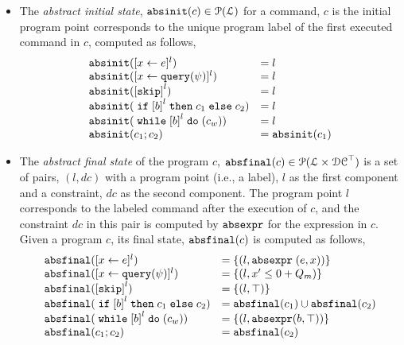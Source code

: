 \begin{itemize}
 \item The \emph{abstract initial state}, $\mathtt{abs}{\mathtt{init}}(c) \in \mathcal{P}(\mathcal{L})$
 for a command, $c$ is the initial program point corresponds to the unique program label of the first executed command in $c$,
 computed as follows,
%
\[
 \begin{array}{ll}
 \absinit(\clabel{\assign{x}{\expr}}{}^l) & = l \\
 \absinit(\clabel{\assign{x}{\query(\qexpr)}}{}^l) & = l \\
 \absinit(\clabel{\eskip}^{l}) & = l \\
 \absinit(\eif \clabel{\bexpr}^{l} \ethen c_1 \eelse c_2) & = l\\
 \absinit(\ewhile \clabel{\bexpr}^{l} \edo (c_w)) & = l \\
 \absinit(c_1 ; c_2) & = \absinit(c_1) \\
 \end{array}
 \]
\item The \emph{abstract final state} of the program $c$, 
$\mathtt{abs}{\mathtt{final}}(c) \in \mathcal{P}(\mathcal{L} \times \mathcal{DC}^{\top})$
is a set of pairs, $(l, dc)$ with a
program point (i.e., a label), $l$ as the first component and a constraint, 
$dc$ as the second component.
The program point $l$ corresponds to the labeled command after the execution of $c$,
and the constraint $dc$ in this pair is computed by $\mathtt{abs}{\mathtt{expr}}$ for the expression in $c$.
\\
Given a program $c$, its final state, $\mathtt{abs}{\mathtt{final}}(c)$ is computed as follows,
 \[
 \begin{array}{ll}
 \absfinal(\clabel{\assign{x}{\expr}}{}^l) & = \{(l, \absexpr\eapp (\expr, x))\} \\
 \absfinal(\clabel{\assign{x}{\query(\qexpr)}}{}^l) & = \{
 (l, x' \leq 0 + Q_m )\} \\
 \absfinal(\clabel{\eskip}^{l}) 
 & = \{(l, \top)\} \\
 \absfinal(\eif \clabel{\bexpr}^{l} \ethen c_1 \eelse c_2) & = \absfinal(c_1) \cup \absfinal(c_2) \\
 \absfinal(\ewhile \clabel{\bexpr}^{l} \edo (c_w)) & = \{(l, \absexpr(\bexpr, \top))\} \\
 \absfinal(c_1 ; c_2) & = \absfinal(c_2) \\
 \end{array}
 \]
\end{itemize}
